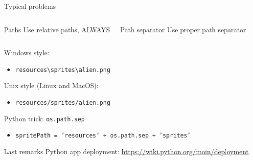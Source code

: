 \documentclass[10pt,compress]{beamer} %
\begin{document}
\begin{frame}{Typical problems}
    \begin{columns}
		\begin{alertblock}{Paths}
		Use relative paths, ALWAYS
		\end{alertblock}

		\begin{alertblock}{Path separator}
		Use proper path separator
		\end{alertblock}
    	\end{columns}

		\bigskip

		Windows style:
		\begin{itemize}
		\item \texttt{resources\textbackslash sprites\textbackslash alien.png}
		\end{itemize}

		Unix style (Linux and MacOS):
		\begin{itemize}
		\item \texttt{resources/sprites/alien.png}
		\end{itemize}

		Python trick: \texttt{os.path.sep}
		\begin{itemize}
			\item \texttt{spritePath = 'resources' + os.path.sep + 'sprites'}
		\end{itemize}
\end{frame}

\begin{frame}{Last remarks}
	Python app deployment: \url{https://wiki.python.org/moin/deployment}
\end{frame}
\end{document}
